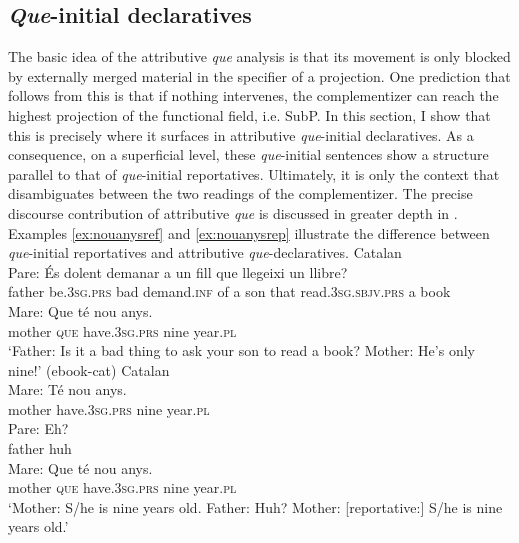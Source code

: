 \subsection{\emph{Que}-initial declaratives}\label{sec:presupinitialC}

The basic idea of the attributive \emph{que}  analysis  is that its movement is only blocked by externally merged material in the specifier of a projection. One prediction that follows from this is that if  nothing intervenes, the complementizer  can  reach the highest projection of the functional field, i.e. SubP. In this section, I show  that this is precisely where it surfaces in attributive \emph{que}-initial declaratives.  As a consequence, on a superficial level,  these \emph{que}-initial sentences show a  structure parallel to that of \emph{que}-initial reportatives. Ultimately, it is  only the context that disambiguates between the two readings of the complementizer.
The precise discourse contribution of attributive \emph{que} is discussed in greater depth in . Examples \eqref{ex:nouanysref} and \eqref{ex:nouanysrep} illustrate the difference between \emph{que}-initial reportatives and attributive \emph{que}-declaratives.
\ea  \label{ex:nouanysref} 
Catalan\\
	\gll Pare: És dolent demanar a un fill que llegeixi un llibre?\\
	father be.\textsc{3sg.prs} bad demand.\textsc{inf} of a son that read.\textsc{3sg.sbjv.prs} a book\\
	\gll Mare: Que té nou anys.\\
	mother \textsc{que} have.\textsc{3sg.prs} nine year.\textsc{pl}\\
	\glt `Father: Is it a bad thing to ask your son to read a book? Mother: He's only nine!' (ebook-cat) 
\ex  \label{ex:nouanysrep}
Catalan\\
 	\gll Mare: Té nou anys. \\
	mother have.\textsc{3sg.prs} nine year.\textsc{pl}\\
	\gll Pare: Eh?\\
	father huh\\
	\gll Mare: Que té nou anys.\\
	mother \textsc{que} have.\textsc{3sg.prs} nine year.\textsc{pl}\\
	\glt `Mother: S/he is nine years old. Father: Huh? Mother: [reportative:] S/he is nine years old.' 
\z 

